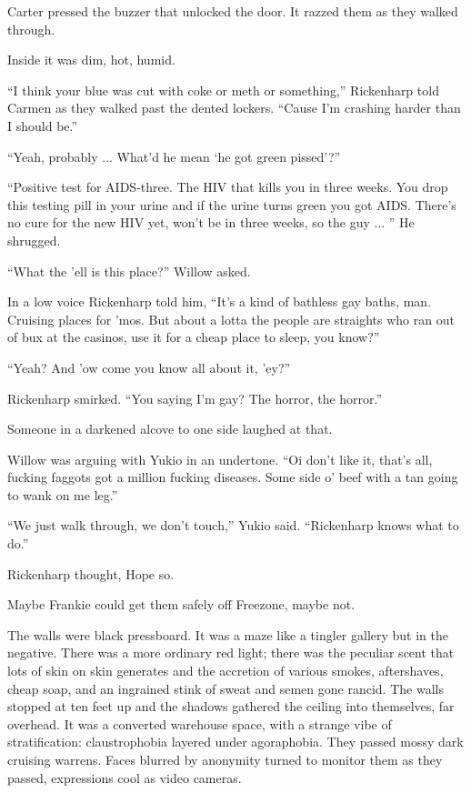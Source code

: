 Carter pressed the buzzer that unlocked the door. It razzed them as they walked through.

Inside it was dim, hot, humid.

``I think your blue was cut with coke or meth or something,'' Rickenharp told Carmen as they walked past the dented lockers. ``Cause I'm crashing harder than I should be.''

``Yeah, probably ... What'd he mean ‘he got green pissed'?''

``Positive test for AIDS-three. The HIV that kills you in three weeks. You drop this testing pill in your urine and if the urine turns green you got AIDS. There's no cure for the new HIV yet, won't be in three weeks, so the guy ... '' He shrugged.

``What the 'ell is this place?'' Willow asked.

In a low voice Rickenharp told him, ``It's a kind of bathless gay baths, man. Cruising places for 'mos. But about a lotta the people are straights who ran out of bux at the casinos, use it for a cheap place to sleep, you know?''

``Yeah? And 'ow come you know all about it, 'ey?''

Rickenharp smirked. ``You saying I'm gay? The horror, the horror.''

Someone in a darkened alcove to one side laughed at that.

Willow was arguing with Yukio in an undertone. ``Oi don't like it, that's all, fucking faggots got a million fucking diseases. Some side o' beef with a tan going to wank on me leg.''

``We just walk through, we don't touch,'' Yukio said. ``Rickenharp knows what to do.''

Rickenharp thought, Hope so.

Maybe Frankie could get them safely off Freezone, maybe not.

The walls were black pressboard. It was a maze like a tingler gallery but in the negative. There was a more ordinary red light; there was the peculiar scent that lots of skin on skin generates and the accretion of various smokes, aftershaves, cheap soap, and an ingrained stink of sweat and semen gone rancid. The walls stopped at ten feet up and the shadows gathered the ceiling into themselves, far overhead. It was a converted warehouse space, with a strange vibe of stratification: claustrophobia layered under agoraphobia. They passed mossy dark cruising warrens. Faces blurred by anonymity turned to monitor them as they passed, expressions cool as video cameras.

